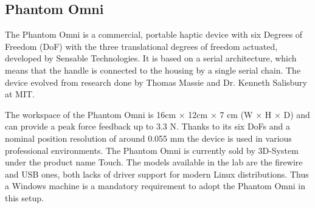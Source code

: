 \begin{table}[htbp]
	\caption{Kubeedge - Performance Measurement: camera 20 Hz \label{tab:kubeedge-Performance-Measurement-20hz}}
\end{table}










\subsection{Phantom Omni}
The Phantom Omni is a commercial, portable haptic device with six Degrees of Freedom (DoF) with the three translational degrees of freedom actuated, developed by Sensable Technologies. It is based on a serial architecture, which means that the handle is connected to the housing by a single serial chain.
The device evolved from research done by Thomas Massie and Dr. Kenneth Salisbury at MIT.

The workspace of the Phantom Omni is 16cm $\times$ 12cm $\times$ 7 cm (W $\times$ H $\times$ D) and can provide a peak force feedback up to 3.3 N. Thanks to its six DoFs and a nominal position resolution of around 0.055 mm the device is used in various professional environments. The Phantom Omni is currently sold by 3D-System under the product name Touch.
The models available in the lab are the firewire  and USB ones, both lacks of driver support for modern Linux distributions. Thus a Windows machine is a mandatory requirement to adopt the Phantom Omni in this setup.

